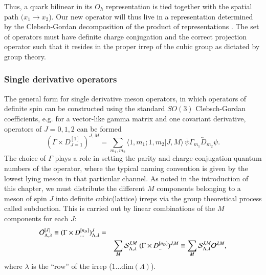 Thus, a quark bilinear in its $O_h$ representation is tied together with the spatial path $(x_1 \to x_2$). Our new operator will thus live in a representation determined by the Clebsch-Gordan decomposition of the product of representations \cite{Basak_2005}. The set of operators must have definite charge conjugation and the correct projection operator such that it resides in the proper irrep of the cubic group as dictated by group theory.  

\subsubsection{Single derivative operators}
The general form for single derivative meson operators, in which operators of definite spin can be constructed using the standard $SO(3)$ Clebsch-Gordan coefficients, e.g. for a vector-like gamma matrix and one covariant derivative, operators of $J=0,1,2$ can be formed \cite{Dudek_2010}
\begin{equation}
 (\Gamma \times D^{[1]}_{J=1} )^{J, M} = \sum_{m_1, m_2}\big\langle 1, m_1 ; 1, m_2 \big| J, M
  \big\rangle\,  \bar{\psi} \Gamma_{m_1}
  \overleftrightarrow{D}_{m_2} \psi. \nonumber
\end{equation}
The choice of $\Gamma$ plays a role in setting the parity and charge-conjugation quantum numbers of the operator, where the typical naming convention is given by the lowest lying meson in that particular channel. As noted in the introduction of this chapter, we must distribute the different $M$ components belonging to a meson of spin $J$ into definite cubic(lattice) irreps via the group theoretical process called subduction. This is carried out by linear combinations of the $M$ components for each $J$\cite{Dudek_2010}:
\begin{eqnarray}
{\cal O}^{[J]}_{\Lambda,\lambda} \equiv (\Gamma \times D^{[n_D]}_{\ldots})^J_{\Lambda, \lambda} =  \nonumber\\
& & \sum_M {\cal
     S}^{J,M}_{\Lambda, \lambda}   \; (\Gamma \times
   D^{[n_D]}_{\ldots})^{J,M} \equiv \sum_M {\cal S}^{J,M}_{\Lambda,\lambda} {\cal O}^{J,M}, \nonumber
\end{eqnarray}
where $\lambda$ is the ``row'' of the irrep ($1\ldots\mathrm{dim}(\Lambda)$). 



